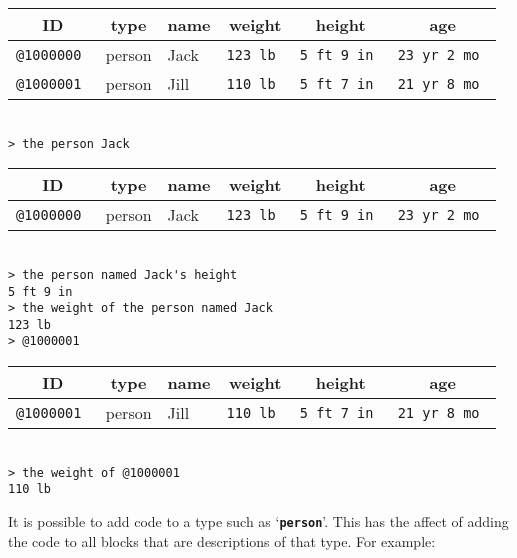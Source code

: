 \documentclass[12pt]{article}
\newcommand{\TT}[1]{{\tt \bfseries #1}}
\newenvironment{indpar}[1][0.3in]%
	{\begin{list}{}%
		     {\setlength{\itemsep}{0in}%
		      \setlength{\topsep}{0in}%
		      \setlength{\parsep}{1ex}%
		      \setlength{\labelwidth}{#1}%
		      \setlength{\leftmargin}{#1}%
		      \addtolength{\leftmargin}{\labelsep}}%
	 \item}%
	{\end{list}}
\begin{document}
\begin{indpar}
\begin{tabular}{|r|l|l|r|r|r|}
\hline
\multicolumn{1}{|c}{\bf ID} &
\multicolumn{1}{|c}{\bf type} &
\multicolumn{1}{|c}{\bf name} &
\multicolumn{1}{|c}{\bf weight} &
\multicolumn{1}{|c}{\bf height} &
\multicolumn{1}{|c|}{\bf age} \\
\hline
\tt @1000000 & person & Jack & \tt 123 lb & \tt 5 ft 9 in & \tt 23 yr 2 mo \\
\tt @1000001 & person & Jill & \tt 110 lb & \tt 5 ft 7 in & \tt 21 yr 8 mo \\
\hline
\end{tabular} \\[0.5ex]
\verb|> the person Jack| \\
\begin{tabular}{|r|l|l|r|r|r|}
\hline
\multicolumn{1}{|c}{\bf ID} &
\multicolumn{1}{|c}{\bf type} &
\multicolumn{1}{|c}{\bf name} &
\multicolumn{1}{|c}{\bf weight} &
\multicolumn{1}{|c}{\bf height} &
\multicolumn{1}{|c|}{\bf age} \\
\hline
\tt @1000000 & person & Jack & \tt 123 lb & \tt 5 ft 9 in & \tt 23 yr 2 mo \\
\hline
\end{tabular} \\[0.5ex]
\verb|> the person named Jack's height| \\
\verb|5 ft 9 in| \\
\verb|> the weight of the person named Jack| \\
\verb|123 lb| \\
\verb|> @1000001| \\
\begin{tabular}{|r|l|l|r|r|r|}
\hline
\multicolumn{1}{|c}{\bf ID} &
\multicolumn{1}{|c}{\bf type} &
\multicolumn{1}{|c}{\bf name} &
\multicolumn{1}{|c}{\bf weight} &
\multicolumn{1}{|c}{\bf height} &
\multicolumn{1}{|c|}{\bf age} \\
\hline
\tt @1000001 & person & Jill & \tt 110 lb & \tt 5 ft 7 in & \tt 21 yr 8 mo \\
\hline
\end{tabular} \\[0.5ex]
\verb|> the weight of @1000001| \\
\verb|110 lb|
\end{indpar}

It is possible to add code to a type such as `\TT{person}'.  This has
the affect of adding the code to all blocks that are descriptions of that type.
For example:
\end{document}
